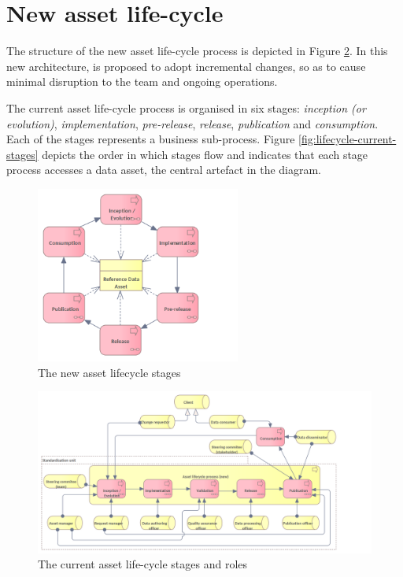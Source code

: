 	\section{New asset life-cycle}
	\label{sec:lifecycle-new}	
	
	The structure of the new asset life-cycle process is depicted in Figure \ref{fig:lifecycle-new}. In this new architecture, is proposed to adopt incremental changes, so as to cause minimal disruption to the team and ongoing operations. 

    The current asset life-cycle process is organised in six stages: \textit{inception (or evolution)}, \textit{implementation}, \textit{pre-release}, \textit{release}, \textit{publication} and \textit{consumption}. Each of the stages represents a business sub-process. Figure \ref{fig:lifecycle-current-stages} depicts the order in which stages flow and indicates that each stage process accesses a data asset, the central artefact in the diagram.
	
	\begin{figure}[h]
		\centering
		\includegraphics[width=0.6\textwidth]{docs/architecture/images/business/Lifecycle process only (current).png}
		\caption{The new asset lifecycle stages}
		\label{fig:lifecycle-new-stages}
	\end{figure}
	

	\begin{figure}[h]
		\centering
		\includegraphics[width=1.05\textwidth]{images/business/Lifecycle (new).png}
		\caption{The current asset life-cycle stages and roles}
		\label{fig:lifecycle-new}
	\end{figure}
	
